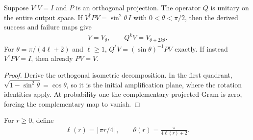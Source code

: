 \begin{lemma}
    \label{thm:mpu_uniform_postselection_amplification}
    \leanok
    Suppose $V^\dagger V=I$ and $P$ is an orthogonal projection.
    The operator $Q$ is unitary on the entire output space.
    If $V^\dagger PV=\sin^2\theta\,I$ with $0<\theta<\pi/2$,
    then the derived success and failure maps give
    \begin{align}
        V=V_\theta,\qquad Q^kV=V_{\theta+2k\theta}.
    \end{align}
    For $\theta=\pi/(4\ell+2)$ and $\ell\geq1$,
    $Q^\ell V=(\sin\theta)^{-1}PV$ exactly.
    If instead $V^\dagger PV=I$, then already $PV=V$.
\end{lemma}
\begin{proof}\leanok
    Derive the orthogonal isometric decomposition. In the first
    quadrant, $\sqrt{1-\sin^2\theta}=\cos\theta$, so it is the
    initial amplification plane, where the rotation identities apply.
    At probability one the complementary projected Gram is zero,
    forcing the complementary map to vanish.
\end{proof}

\begin{definition}
    \label{def:mpu_exact_amplification_budget}
    \leanok
    For $r\geq0$, define
    \begin{align}
        \ell(r)=\lceil\pi r/4\rceil,
        \qquad \theta(r)=\frac{\pi}{4\ell(r)+2}.
    \end{align}
\end{definition}


